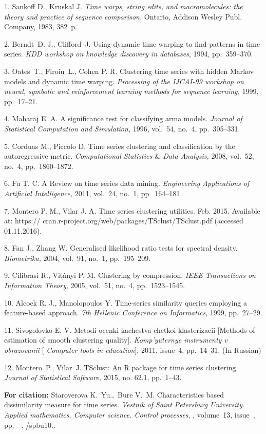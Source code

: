{\footnotesize

\vskip 4mm


\vskip 3mm


1. Sankoff D., Kruskal J. {\it Time warps, string edits, and
macromolecules: the theory and practice of sequence comparison.}
Ontario, Addison Wesley Publ. Company, 1983, 382~p.

2. Berndt~D. J., Clifford~J. Using dynamic time warping to find
patterns in time series. {\it KDD workshop on knowledge discovery
in databases}, 1994, pp.~359--370.

3. Oates~T., Firoiu~L., Cohen P. R. Clustering time series with
hidden Markov models and dynamic time warping. {\it Processing of
the IJCAI-99 workshop on neural, symbolic and reinforcement
learning methods for sequence learning,} 1999, pp.~17--21.

4. Maharaj E. A. A significance test for classifying arma models.
{\it Journal of Statistical Computation and Simulation,} 1996,
vol.~54, no.~4, pp.~305--331.

5. Corduas M., Piccolo D. Time series clustering and
classification by the autoregressive metric. {\it Computational
Statistics $\&$ Data Analysis,} 2008, vol.~52, no.~4,
pp.~1860--1872.

6. Fu T. C. A Review on time series data mining. {\it Engineering
Applications of Artificial Intelligence,} 2011, vol.~24, no.~1,
pp.~164--181.

7. Montero P. M., Vilar J. A. Time series clustering utilities.
Feb. 2015. Available at: https://\linebreak
cran.r-project.org/web/packages/TSclust/TSclust.pdf (accessed
01.11.2016).

8. Fan J., Zhang W. Generalised likelihood ratio tests for
spectral density. {\it Biometrika,} 2004, vol.~91, no.~1,
pp.~195--209.

9. Cilibrasi R., Vit{\`a}nyi P. M. Clustering by compression. {\it
IEEE Transactions on Information Theory},  2005, vol.~51, no.~4,
pp.~1523--1545.

10. Alcock R. J., Manolopoulos Y. Time-series similarity queries
employing a feature-based approach. {\it 7th Hellenic Conference
on Informatics},  1999, pp.~27--29.

11. Sivogolovko E. V. Metodi ocenki kachestva chetkoi
klasterizacii [Methods of estimation of smooth clustering
quality]. {\it Komp'yuternye instrumenty v obrazovanii} [{\it
Computer tools in education}], 2011, issue~4, pp.~14--31. (In
Russian)

12. Montero~P., Vilar~J. TSclust: An R package for time series
clustering. {\it Journal of Statistical Software,} 2015, no. 62.1,
pp.~1--43.



\vskip 2mm

{\bf For citation:} Staroverova K.~Yu.,~Bure V.~M. Characteristics
based dissimilarity measure for time series. {\it Vestnik of Saint
Petersburg University. Applied mathematics. Computer science.
Control processes}, \issueyear, volume~13, issue~\issuenum,
pp.~\pageref{p5}--\pageref{p5e}.
\doivyp/spbu10.\issueyear.


}
